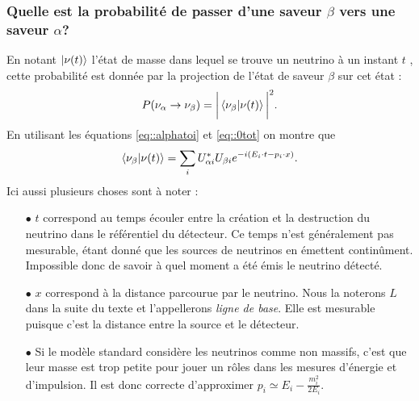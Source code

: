             \subsubsection{Quelle est la probabilité de passer d'une saveur $\beta$ vers une saveur $\alpha$?}
            En notant $\ket{\nu(t)}$ l'état de masse dans lequel se trouve un neutrino à un instant $t$ , cette probabilité est donnée par la projection de l'état de saveur $\beta$ sur cet état :
            \begin{equation}
                P(\nu_{\alpha}\to\nu_{\beta})=\bigg|\braket{\nu_{\beta}}{\nu(t)}\bigg|^2.
            \end{equation}
            En utilisant les équations \eqref{eq::alphatoi} et \eqref{eq::0tot} on montre que
            \begin{equation}
                \braket{\nu_{\beta}}{\nu(t)} = \sum_i U_{\alpha i}^*U_{\beta i} e^{-i(E_i\cdot t - p_i\cdot x)}.
            \end{equation}
            Ici aussi plusieurs choses sont à noter : 
            \begin{itemize}
                \item[$\bullet$] $t$ correspond au temps écouler entre la création et la destruction du neutrino dans le référentiel du détecteur. Ce temps n'est généralement pas mesurable, étant donné que les sources de neutrinos en émettent continûment. Impossible donc de savoir à quel moment a été émis le neutrino détecté.
                \item[$\bullet$] $x$ correspond à la distance parcourue par le neutrino. Nous la noterons $L$ dans la suite du texte et l'appellerons \textit{ligne de base}. Elle est mesurable puisque c'est la distance entre la source et le détecteur.
                \item[$\bullet$] Si le modèle standard considère les neutrinos comme non massifs, c'est que leur masse est trop petite pour jouer un rôles dans les mesures d'énergie et d'impulsion. Il est donc correcte d'approximer $p_i \simeq E_i - \frac{m_i^2}{2E_i}$.
            \end{itemize}
            

